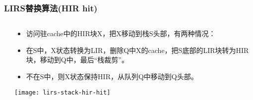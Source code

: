 \begin{frame}[plain]
	\frametitle{LIRS替换算法(HIR hit)}
	\begin{columns}
		\begin{column}{.1\textwidth}
			\centering

			
		\end{column}
		
		\begin{column}{.9\textwidth}
			
			\begin{itemize}
				
			\item 访问驻cache中的HIR块X，把X移动到栈S头部，有两种情况：
				\item 在S中，X状态转换为LIR，删除Q中X的cache，把S底部的LIR块转为HIR块，移动到Q中，最后“栈裁剪”。
				\item 不在S中，则X状态保持HIR，从队列Q中移动到Q头部。
				
				
			\end{itemize}
			\centering
			 \texttt{[image: lirs-stack-hir-hit]}
			
		\end{column}
		
		
	\end{columns}
\end{frame}




